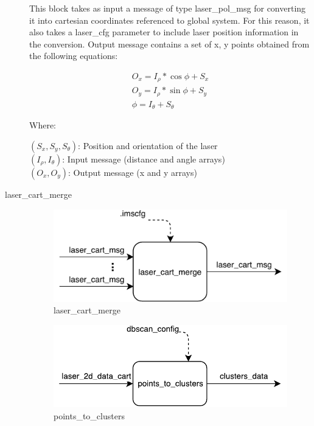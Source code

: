 \begin{description}
This block takes as input a message of type laser\_pol\_msg for converting it into cartesian coordinates referenced to global system. For this reason, it also takes a laser\_cfg parameter to include laser position information in the conversion. Output message contains a set of x, y points obtained from the following equations:

\begin{eqnarray*}
O_x = I_\rho*\cos{\phi}+S_x \\
O_y = I_\rho*\sin{\phi} + S_y \\
\phi = I_\theta + S_\theta
\end{eqnarray*}

Where:

$(S_x, S_y, S_\theta)$: Position and orientation of the laser \\
$(I_\rho, I_\theta )$: Input message (distance and angle arrays) \\
$(O_x, O_y )$: Output message (x and y arrays) \\


\item[laser\_cart\_merge] \hfill

\begin{figure}[ht!]
\centering
\includegraphics[scale=0.8]{fig/3/laser_cart_merge.pdf}
\caption{laser\_cart\_merge}
\label{laser_cart_merge}
\end{figure}

\begin{figure}[ht!]
\centering
\includegraphics[scale=0.7]{fig/3/points_to_clusters.pdf}
\caption{points\_to\_clusters}
\label{points_to_clusters}
\end{figure}


\end{description}
